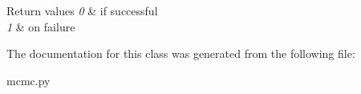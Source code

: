 \begin{DoxyRetVals}{Return values}
{\em 0} & if successful \\
\hline
{\em 1} & on failure \\
\hline
\end{DoxyRetVals}


The documentation for this class was generated from the following file\+:\begin{DoxyCompactItemize}
\item 
mcmc.\+py\end{DoxyCompactItemize}
